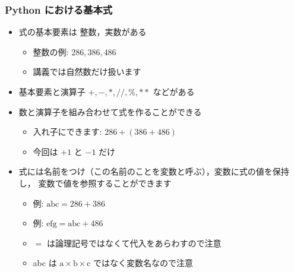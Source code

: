\begin{frame}[fragile]
\frametitle{Python における基本式}
  \begin{itemize}
\item 式の基本要素は 整数，実数がある
    \begin{itemize}
\item 整数の例: \(286, 386, 486\) 
\item 講義では自然数だけ扱います
    \end{itemize}
\item 基本要素と演算子 \(+, -, *, \slash\slash, \%, **\) などがある
\item 数と演算子を組み合わせて式を作ることができる
    \begin{itemize}
\item 入れ子にできます: \(286+(386+486)\) 
\item 今回は \(+1\) と \(-1\) だけ
    \end{itemize}
\item 式には名前をつけ（この名前のことを変数と呼ぶ），変数に式の値を保持し，
変数で値を参照することができます
    \begin{itemize}
\item 例: \(\mbox{abc}=286+386\) 
\item 例: \(\mbox{efg}=\mbox{abc}+486\) 
\item $=$ は論理記号ではなくて代入をあらわすので注意
\item abc は \(\mbox{a}\times\mbox{b}\times\mbox{c}\) ではなく変数名なので注意
    \end{itemize}
  \end{itemize}
\end{frame}
